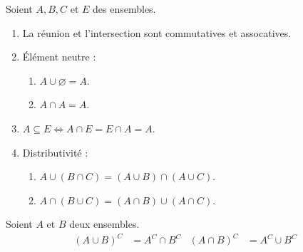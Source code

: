 \begin{proposition}
	Soient $A, B, C$ et $E$ des ensembles.
	\begin{enumerate}
		\item La réunion et l'intersection sont commutatives et assocatives.
		\item \'Elément neutre :
		\begin{enumerate}
			\item $A \cup \varnothing = A$.
			\item $A \cap A = A$.
		\end{enumerate}
		\item $A \subseteq E \iff A \cap E = E \cap A = A$.
		\item Distributivité :
		\begin{enumerate}
			\item $A \cup (B \cap C) = (A \cup B) \cap (A \cup C)$.
			\item $A \cap (B \cup C) = (A \cap B) \cup (A \cap C)$.
		\end{enumerate}
	\end{enumerate}
\end{proposition}

\begin{proposition}
  Soient $A$ et $B$ deux ensembles.
  \begin{align*}
    (A \cup B)^{C} &= A^{C} \cap B^{C} & (A \cap B)^{C} &= A^{C} \cup B^{C}
  \end{align*}
\end{proposition}

